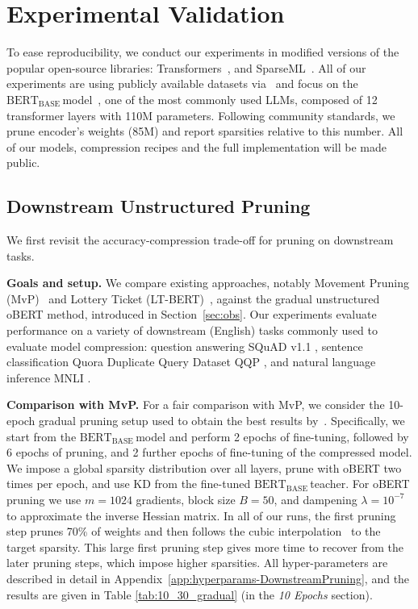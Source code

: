 \documentclass[11pt]{article}
\newcommand{\bert}{$\textrm{BERT}_{\textrm{BASE}}\,$}
\begin{document}
\section{Experimental Validation}
\label{sec:experiments}
To ease reproducibility, we conduct our experiments in modified versions of the popular open-source libraries: Transformers~\cite{wolf-etal-2020-transformers}, and SparseML~\cite{pmlr-v119-kurtz20a}. All of our experiments are using publicly available datasets via~\citet{hf-datasets} and focus on the \bert model~\cite{Devlin2019BERTPO}, one of the most commonly used LLMs, composed of 12 transformer layers with 110M parameters. Following community standards, we prune encoder's weights (85M) and report sparsities relative to this number. All of our models, compression recipes and the full implementation will be made public.

\subsection{Downstream Unstructured Pruning}
\label{sec:downstream}

We first revisit the accuracy-compression trade-off for pruning on downstream tasks. 

\noindent\textbf{Goals and setup.} 
We compare existing approaches, notably Movement Pruning (MvP)~\cite{Sanh2020MovementPA} and Lottery Ticket (LT-BERT)~\cite{chen2020lottery}, against the gradual unstructured oBERT method, introduced in Section~\ref{sec:obs}. Our experiments evaluate performance on a variety of downstream (English) tasks commonly used to evaluate model compression: question answering SQuAD v1.1 \cite{Rajpurkar2016SQuAD1Q}, sentence classification Quora Duplicate Query Dataset QQP \cite{shankar2017first}, and natural language inference MNLI \cite{N18-1101}.

\noindent\textbf{Comparison with MvP.} For a fair comparison with MvP, we consider the 10-epoch gradual pruning setup used to obtain the best results by~\citet{Sanh2020MovementPA}. Specifically, we start from the \bert model and perform 2 epochs of fine-tuning, followed by 6 epochs of pruning, and 2 further epochs of fine-tuning of the compressed model. We impose a global sparsity distribution over all layers, prune with oBERT two times per epoch, and use KD from the fine-tuned \bert teacher. For oBERT pruning we use $m=1024$ gradients, block size $B=50$, and dampening $\lambda = 10^{-7}$ to approximate the inverse Hessian matrix. In all of our runs, the first pruning step prunes 70\% of weights and then follows the cubic interpolation~\cite{Zhu2018ToPO} to the target sparsity. This large first pruning step gives more time to recover from the later pruning steps, which impose higher sparsities. All  hyper-parameters are described in detail in Appendix~\ref{app:hyperparams-DownstreamPruning}, and the results are given in Table \ref{tab:10_30_gradual} (in the \textit{10 Epochs} section). 
\end{document}
